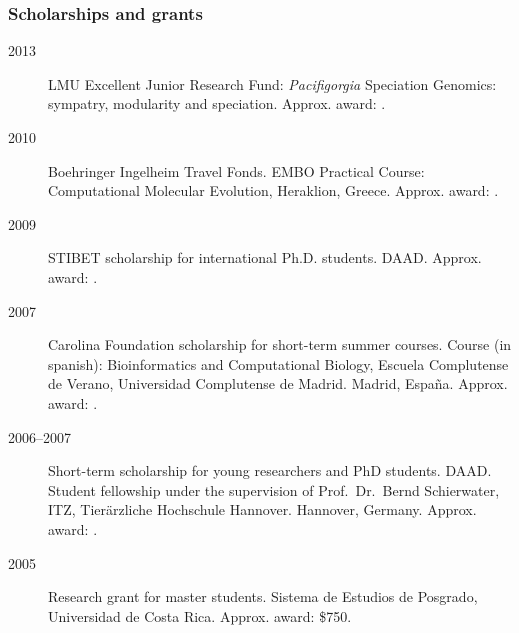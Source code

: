 \documentclass[letter,10pt]{article}
\begin{document}
\subsubsection*{Scholarships and grants}
\begin{description}
\item[2013] LMU Excellent Junior Research Fund: \emph{Pacifigorgia} Speciation Genomics: sympatry, modularity and speciation. Approx. award: .

\item[2010] Boehringer Ingelheim Travel Fonds. EMBO Practical Course: Computational Molecular Evolution, Heraklion, Greece. Approx. award: .

\item[2009]  STIBET scholarship for international Ph.D. students. DAAD. Approx. award: . 

\item[2007] Carolina Foundation scholarship for short-term summer courses. Course (in spanish): Bioinformatics and Computational Biology, Escuela Complutense de Verano, Universidad Complutense de Madrid. Madrid, Espa\~na. Approx. award: .

\item[2006--2007] Short-term scholarship for young researchers and PhD students. DAAD. Student fellowship under the supervision of Prof.~Dr.~Bernd Schierwater, ITZ, Tier\"arzliche Hochschule Hannover. Hannover, Germany. Approx. award: .

\item[2005] Research grant for master students. Sistema de Estudios de Posgrado, Universidad de Costa Rica. Approx. award: \$750.
\end{description}
\end{document}

